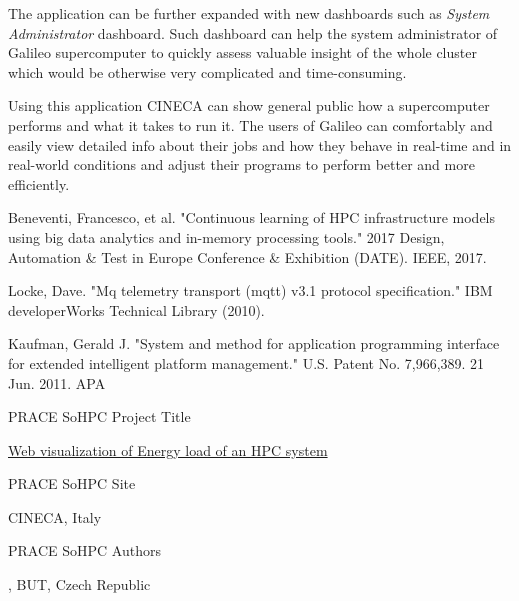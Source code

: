 \documentclass[a4paper, twoside]{article}
\begin{document}
\begin{multicols}{3}
The application can be further expanded with new dashboards such as \textit{System Administrator} dashboard. Such dashboard can help the system administrator of Galileo supercomputer to quickly assess valuable insight of the whole cluster which would be otherwise very complicated and time-consuming.

Using this application CINECA can show general public how a supercomputer performs and what it takes to run it. The users of Galileo can comfortably and easily view detailed info about their jobs and how they behave in real-time and in real-world conditions and adjust their programs to perform better and more efficiently.

\newcommand{\sohpcinfo}[1]{\par\vspace{1ex}\footnotesize
  \textcolor{prace-lightblue}{PRACE SoHPC }%
  \textcolor{prace-darkblue}{#1}\\[0.5ex]\scriptsize
}

\renewcommand\refname{\usefont{OT1}{phv}{m}{n}\selectfont\small{References}}
\begin{thebibliography}{9}
\vspace*{-1ex}  %
\scriptsize
{}
Beneventi, Francesco, et al. "Continuous learning of HPC infrastructure models using big data analytics and in-memory processing tools." 2017 Design, Automation \& Test in Europe Conference \& Exhibition (DATE). IEEE, 2017.

Locke, Dave. "Mq telemetry transport (mqtt) v3.1 protocol specification." IBM developerWorks Technical Library (2010).

Kaufman, Gerald J. "System and method for application programming interface for extended intelligent platform management." U.S. Patent No. 7,966,389. 21 Jun. 2011.
APA
\end{thebibliography}


\vfill
\noindent\begin{minipage}[b]{0.7\linewidth}
\begin{flushleft}
    \selectfont
    \sohpcinfo{ Project Title}
    \href{https://summerofhpc.prace-ri.eu/web-visualization-of-energy-load-of-an-hpc-system/}{Web visualization of Energy load of an HPC system}

    \sohpcinfo{ Site}
    CINECA, Italy

    \sohpcinfo{ Authors}
    \href{mailto:xstehl14@stud.fit.vutbr.cz}{\theauthor},
    BUT, Czech Republic


\end{flushleft}
\end{minipage}
\end{multicols}
\end{document}
